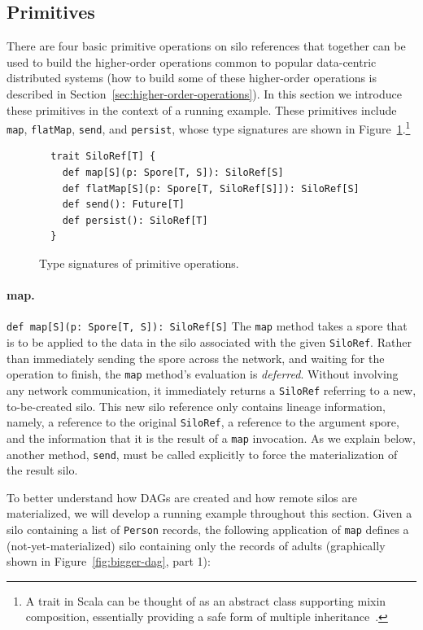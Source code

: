 \documentclass{jfp1}
\begin{document}
\subsection{Primitives}
\label{sec:primitives}

There are four basic primitive operations on silo references that
together can be used to build the higher-order operations common to
popular data-centric distributed systems (how to build some of these
higher-order operations is described in
Section~\ref{sec:higher-order-operations}). In this section we
introduce these primitives in the context of a running example. These
primitives include \verb|map|, \verb|flatMap|, \verb|send|, and
\verb|persist|, whose type signatures are shown in
Figure~\ref{fig:signatures}.\footnote{A trait in Scala can be thought
  of as an abstract class supporting mixin composition, essentially
  providing a safe form of multiple inheritance~\cite{OderskyZ05}.}

\begin{figure}
\centering
\begin{lstlisting}
  trait SiloRef[T] {
    def map[S](p: Spore[T, S]): SiloRef[S]
    def flatMap[S](p: Spore[T, SiloRef[S]]): SiloRef[S]
    def send(): Future[T]
    def persist(): SiloRef[T]
  }
\end{lstlisting}
\caption{Type signatures of primitive operations.}\label{fig:signatures}
\end{figure}


\paragraph{map.}%
%
\texttt{def map[S](p: Spore[T, S]): SiloRef[S]} \newline
%
The \verb|map| method takes a spore that is to be applied to the data in the
silo associated with the given \verb|SiloRef|. Rather than immediately sending
the spore across the network, and waiting for the operation to finish, the
\verb|map| method's evaluation is {\em deferred}. Without involving any network
communication, it immediately returns a \verb|SiloRef| referring to a new,
to-be-created silo. This new silo reference only contains lineage information,
namely, a reference to the original \verb|SiloRef|, a reference to the argument
spore, and the information that it is the result of a \verb|map| invocation. As
we explain below, another method, \verb|send|, must be called
explicitly to force the materialization of the result silo.

To better understand how DAGs are created and how remote silos are materialized,
we will develop a running example throughout this section. Given a silo
containing a list of \verb|Person| records, the following application of
\verb|map| defines a (not-yet-materialized) silo containing only the records of
adults (graphically shown in Figure~\ref{fig:bigger-dag}, part 1):
\end{document}
